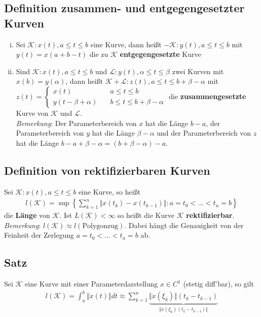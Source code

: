\documentclass[11pt,a4paper]{book}
\newcommand{\1}    	{\mathbbm{1}}
\newcommand{\Kurve}	{{\mathcal{K}}}
\begin{document}
\subsection{Definition zusammen- und entgegengesetzter Kurven}
\begin{enumerate}[(i)]
	\item Sei \(\Kurve : x(t), a \leqslant t \leqslant b\) eine Kurve, dann heißt \(-\Kurve : y(t), a \leqslant t \leqslant b\) mit \(y(t) = x(a + b - t)\) die zu \(\Kurve\) \textbf{entgegengesetzte} Kurve
	\item Sind \(\Kurve : x(t), a \leqslant t \leqslant b\) und \(\mathcal{L} : y(t), \alpha \leqslant t \leqslant \beta\) zwei Kurven mit \(x(b) = y(\alpha)\), dann heißt \(\Kurve + \mathcal{L} : z(t), a \leqslant t \leqslant b + \beta - \alpha\) mit \(z(t) = \left\{ \begin{array}{ll}
	x(t) &\quad a \leqslant t \leqslant b \\
	y(t - \beta + \alpha) &\quad b \leqslant t \leqslant b + \beta - \alpha
	\end{array} \right. \) die \textbf{zusammengesetzte} Kurve von \(\Kurve\) und \(\mathcal{L}\).\\
	\textit{Bemerkung}: Der Parameterbereich von \(x\) hat die Länge \(b-a\), der Parameterbereich von \(y\) hat die Länge \(\beta - \alpha\) und der Parameterbereich von \(z\) hat die Länge \(b - a + \beta - \alpha = (b + \beta - \alpha) - a\).
\end{enumerate} 

\subsection{Definition von rektifizierbaren Kurven}
Sei \(\Kurve : x(t), a \leqslant t \leqslant b\) eine Kurve, so heißt
\begin{align*}
	l(\Kurve) = \sup\left\{ \sum_{k=1}^n \Vert x(t_k) - x(t_{k-1}) \Vert : a = t_0 < ... < t_n = b \right\}
\end{align*}
die \textbf{Länge} von \(\Kurve\). Ist \(L(\Kurve) < \infty\) so heißt die Kurve \(\Kurve\) \textbf{rektifizierbar}.\\
\textit{Bemerkung}: \(l(\Kurve) \approx l(\textrm{Polygonzug})\). Dabei hängt die Genauigkeit von der Feinheit der Zerlegung \(a = t_0 < ... < t_n = b\) ab.

\subsection{Satz}
Sei \(\Kurve\) eine Kurve mit einer Parameterdarstellung \(x \in C^1 \) (stetig diff'bar), so gilt
\begin{align*}
	l(\Kurve) = \int_a^b \Vert \dot{x}(t) \Vert dt \approx 
	\sum_{k=1}^n \underbrace{
		\Vert \dot{x}(\xi_k) \Vert (t_k - t_{k-1}	)
	}_{
		\Vert \dot{x}(\xi_k) (t_k - t_{k-1}) \Vert
	}	
\end{align*}
\end{document}
